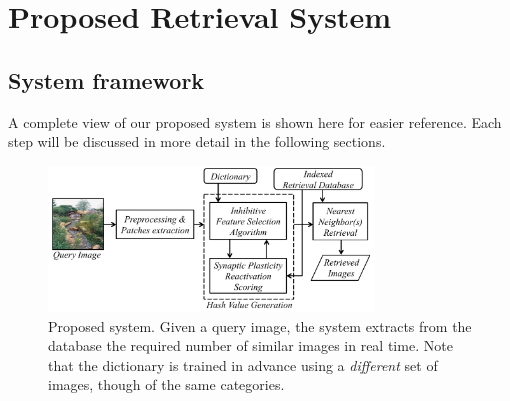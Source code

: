 \documentclass[letterpaper]{article}
\begin{document}

\section{Proposed Retrieval System}

\subsection{System framework}
\label{subsec:framework}
A complete view of our proposed system is shown here for easier reference.
Each step will be discussed in more detail in the following sections.
\begin{figure}[!h]
		\includegraphics[width=3.4in]{figures_dir/aaai_systemDiagram.pdf}
		\caption{Proposed system. Given a query image, the system extracts from the database the required number of similar images in real time. Note that the dictionary is trained in advance using a \emph{different} set of images, though of the same categories.}
		\label{fig:framework}
\end{figure}
\end{document}
